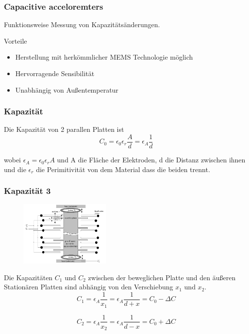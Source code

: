 \documentclass[10pt,a4paper,oneside]{beamer}
\begin{document}
\begin{frame}
	\frametitle{Capacitive acceloremters}
	\begin{block}{Funktionsweise}
		Messung von Kapazitätsänderungen.
	\end{block}

    \bigskip
    
	Vorteile
 	\begin{itemize}
 		\item Herstellung mit herkömmlicher MEMS Technologie möglich
 		\item Hervorragende Sensibilität
		\item Unabhängig von Außentemperatur
 	\end{itemize}
\end{frame}

\begin{frame}
	\frametitle{Kapazität}
	Die Kapazität von 2 parallen Platten ist \cite{AM08}
	\begin{equation}
		C_{0} = \epsilon_{0} \epsilon_{r} \frac{A}{d} = \epsilon_{A} \frac{1}{d}
	\end{equation}
	
	wobei $\epsilon_{A} = \epsilon_{0} \epsilon_{r} A$ und A die Fläche der Elektroden, d die Distanz zwischen ihnen und die $\epsilon_{r}$ die Perimitivität von dem Material dass die beiden trennt.

\end{frame}

\begin{frame}
	\frametitle{Kapazität 3}

\begin{figure}
\includegraphics[width=0.4\textwidth]{images/acceleromter_structure.png}
\end{figure}

Die Kapazitäten $C_{1}$ und $C_{2}$ zwischen der beweglichen Platte und den äußeren Stationären Platten sind abhängig von den Verschiebung $x_{1}$ und $x_{2}$.
	\begin{equation}
		C_{1} = \epsilon_{A} \frac{1}{x_{1}} 
			  = \epsilon_{A} \frac{1}{d+x} 
			  = C_{0} - \Delta C
	\end{equation}
	
	\begin{equation}
		C_{2} = \epsilon_{A} \frac{1}{x_{2}} 
		      = \epsilon_{A} \frac{1}{d-x} 
		      = C_{0} + \Delta C
	\end{equation}
	
\end{frame}
\end{document}
